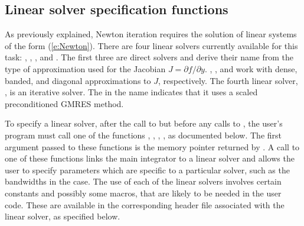 \subsection{Linear solver specification functions}\label{sss:lin_solv_init}

As previously explained, Newton iteration requires the solution of
linear systems of the form (\ref{e:Newton}).  There are four {\cvode} linear
solvers currently available for this task: {\cvdense}, {\cvband}, {\cvdiag},
and {\cvspgmr}.  The first three are direct solvers and derive their name
from the type of approximation used for the Jacobian 
$J = \partial{f}/\partial{y}$.  {\cvdense}, {\cvband}, and {\cvdiag} work with
dense, banded, and diagonal approximations to $J$, respectively.  The
fourth {\cvode} linear solver, {\cvspgmr}, is an iterative solver.  The {\spgmr}
in the name indicates that it uses a scaled preconditioned
GMRES method.

To specify a {\cvode} linear solver, after the call to 
but before any calls to , the user's program must call one
of the functions , , , ,
as documented below. The first argument passed to these functions is the {\cvode}
memory pointer returned by .  A call to one of these
functions links the main {\cvode} integrator to a linear solver and
allows the user to specify parameters which are specific to a
particular solver, such as the bandwidths in the {\cvband} case.
The use of each of the linear solvers involves certain constants and possibly 
some macros, that are likely to be needed in the user code.  These are
available in the corresponding header file associated with the linear
solver, as specified below.

